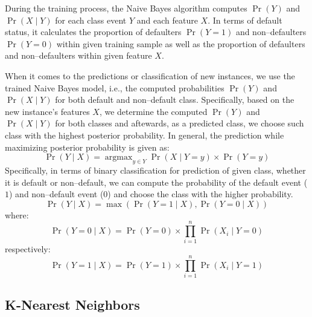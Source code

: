During the training process, the Naive Bayes algorithm computes $\operatorname{Pr}\left(Y\right)$ and $ \operatorname{Pr}\left(X \mid Y \right)$ for each class event $Y$ and each feature $X$.
In terms of default status, it calculates the proportion of defaulters  $\operatorname{Pr}\left(Y = 1\right)$ and non--defaulters $\operatorname{Pr}\left(Y=0\right)$ within given training sample as well as the proportion of defaulters and non--defaulters within given feature $X$.


When it comes to the predictions or classification of new instances, we use the trained Naive Bayes model, i.e., the computed probabilities $\operatorname{Pr}\left(Y\right)$ and $ \operatorname{Pr}\left(X \mid Y \right)$ for both default and non--default class.
Specifically, based on the new instance's features $X$, we determine the computed $\operatorname{Pr}\left(Y\right)$ and $ \operatorname{Pr}\left(X \mid Y \right)$ for both classes and aftewards, as a predicted class, we choose such class with the highest posterior probability. In general, the prediction while maximizing posterior probability is given as:
\begin{equation}\label{eq:nb-corrected}
    \operatorname{Pr}\left(Y \mid X \right) = \operatorname{argmax}_{y \in Y} \operatorname{Pr}\left(X \mid Y = y\right) \times \operatorname{Pr}(Y = y)
\end{equation}
Specifically, in terms of binary classification for prediction of given class, whether it is default or non--default, we can compute the probability of the default event ($1$) and non--default event ($0$) and choose the class with the higher probability.
\begin{equation}\label{eq}
    \operatorname{Pr}\left(Y \mid X \right)  = \max \left(\operatorname{Pr}\left(Y=1 \mid X\right), \operatorname{Pr}\left(Y=0 \mid X\right)\right)
\end{equation}
where:
\begin{equation}
    \operatorname{Pr}\left(Y=0 \mid X \right) = \operatorname{Pr}\left(Y=0\right) \times \prod_{i=1}^{n} \operatorname{Pr}\left(X_i \mid Y=0\right)
\end{equation}
respectively:
\begin{equation}
    \operatorname{Pr}\left(Y=1 \mid X \right) = \operatorname{Pr}\left(Y=1\right) \times \prod_{i=1}^{n} \operatorname{Pr}\left(X_i \mid Y=1\right)
\end{equation}
\subsection{K-Nearest Neighbors}

